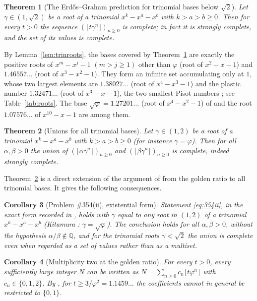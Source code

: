 \documentclass[11pt]{amsart}
\newtheorem{theorem}{Theorem}
\newtheorem{maincor}[theorem]{Corollary}
\theoremstyle{definition}
\theoremstyle{remark}
\newcommand{\Q}{\mathbb{Q}}
\newcommand{\fl}[1]{\lfloor #1\rfloor}
\begin{document}
\begin{theorem}[The Erd\H{o}s--Graham prediction for trinomial bases below $\sqrt2$]\label{thm:B}
Let $\gamma\in(1,\sqrt2)$ be a root of a trinomial $x^k-x^a-x^b$ with $k>a>b\ge0$. Then for
every $t>0$ the sequence $(\fl{t\gamma^n})_{n\ge0}$ is complete; in fact it is strongly
complete, and the set of its values is complete.
\end{theorem}

By Lemma~\ref{lem:trinroots}, the bases covered by Theorem~\ref{thm:B} are exactly the
positive roots of $x^m-x^j-1$ $(m>j\ge1)$ other than $\varphi$ (root of $x^2-x-1$) and
$1.46557\ldots$ (root of $x^3-x^2-1$). They form an infinite set accumulating only at $1$,
whose two largest elements are $1.38027\ldots$ (root of $x^4-x^3-1$) and the plastic number
$1.32471\ldots$ (root of $x^3-x-1$), the two smallest Pisot numbers \cite{Sie44}; see
Table~\ref{tab:roots}. The base $\sqrt\varphi=1.27201\ldots$ (root of $x^4-x^2-1$) of
\cite{Kit26} and the root $1.07576\ldots$ of $x^{10}-x-1$ are among them.

\begin{theorem}[Unions for all trinomial bases]\label{thm:C}
Let $\gamma\in(1,2)$ be a root of a trinomial $x^k-x^a-x^b$ with $k>a>b\ge0$ (for instance
$\gamma=\varphi$). Then for all $\alpha,\beta>0$ the union of
$(\fl{\alpha\gamma^n})_{n\ge0}$ and $(\fl{\beta\gamma^n})_{n\ge0}$ is complete, indeed
strongly complete.
\end{theorem}

Theorem~\ref{thm:C} is a direct extension of the argument of \cite{Kit26,Rev26} from the golden
ratio to all trinomial bases. It gives the following consequences.

\begin{maincor}[Problem \#354(ii), existential form]\label{cor:D}
Statement \eqref{eq:354ii}, in the exact form recorded in \cite{FC}, holds with $\gamma$ equal to
any root in $(1,2)$ of a trinomial $x^k-x^a-x^b$ (Kitamura \cite{Kit26}: $\gamma=\sqrt\varphi$).
The conclusion holds for all $\alpha,\beta>0$, without the hypothesis $\alpha/\beta\notin\Q$, and
for the trinomial roots $\gamma<\sqrt2$ the union is complete even when regarded as a set of
values rather than as a multiset.
\end{maincor}

\begin{maincor}[Multiplicity two at the golden ratio]\label{cor:E}
For every $t>0$, every sufficiently large integer $N$ can be written as
$N=\sum_{n\ge0}c_n\fl{t\varphi^n}$ with $c_n\in\{0,1,2\}$. By \cite{vD26}, for
$t\ge 3/\varphi^2=1.1459\ldots$ the coefficients cannot in general be restricted to
$\{0,1\}$.
\end{maincor}
\end{document}
